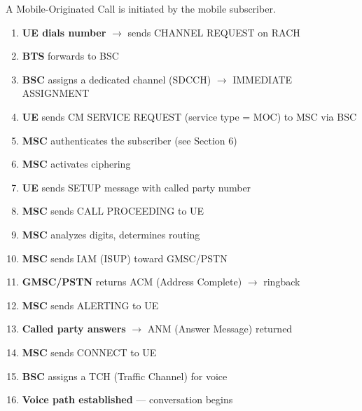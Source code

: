 \CNchained{}

A Mobile-Originated Call is initiated by the mobile subscriber.


\begin{enumerate}
\def\labelenumi{\arabic{enumi}.}
\tightlist
\item
  \textbf{UE dials number} \ensuremath{\to} sends CHANNEL REQUEST on RACH
\item
  \textbf{BTS} forwards to BSC
\item
  \textbf{BSC} assigns a dedicated channel (SDCCH) \ensuremath{\to} IMMEDIATE ASSIGNMENT
\item
  \textbf{UE} sends CM SERVICE REQUEST (service type = MOC) to MSC via BSC
\item
  \textbf{MSC} authenticates the subscriber (see Section 6)
\item
  \textbf{MSC} activates ciphering
\item
  \textbf{UE} sends SETUP message with called party number
\item
  \textbf{MSC} sends CALL PROCEEDING to UE
\item
  \textbf{MSC} analyzes digits, determines routing
\item
  \textbf{MSC} sends IAM (ISUP) toward GMSC/\allowbreak{}PSTN
\item
  \textbf{GMSC/\allowbreak{}PSTN} returns ACM (Address Complete) \ensuremath{\to} ringback
\item
  \textbf{MSC} sends ALERTING to UE
\item
  \textbf{Called party answers} \ensuremath{\to} ANM (Answer Message) returned
\item
  \textbf{MSC} sends CONNECT to UE
\item
  \textbf{BSC} assigns a TCH (Traffic Channel) for voice
\item
  \textbf{Voice path established} — conversation begins
\end{enumerate}






